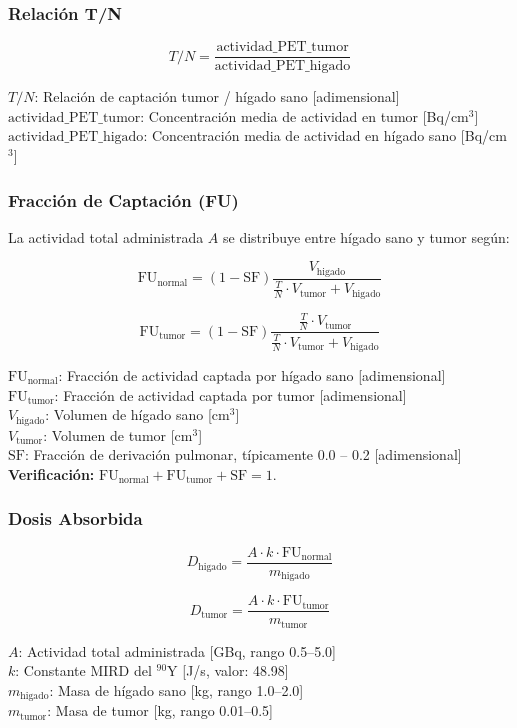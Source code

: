 \documentclass[12pt,a4paper]{article}
\newcommand{\vardef}[2]{\noindent\textbf{#1}: #2\\}
\begin{document}
\subsubsection{Relación T/N}

$$T/N = \frac{\text{actividad\_PET\_tumor}}{\text{actividad\_PET\_higado}}$$

\vardef{$T/N$}{Relación de captación tumor / hígado sano [adimensional]}
\vardef{$\text{actividad\_PET\_tumor}$}{Concentración media de actividad en tumor [Bq/cm$^3$]}
\vardef{$\text{actividad\_PET\_higado}$}{Concentración media de actividad en hígado sano [Bq/cm$^3$]}

\subsubsection{Fracción de Captación (FU)}

La actividad total administrada $A$ se distribuye entre hígado sano y tumor según:

$$\text{FU}_{\text{normal}} = (1-\text{SF})\frac{V_{\text{higado}}}{\frac{T}{N}\cdot V_{\text{tumor}} + V_{\text{higado}}}$$

$$\text{FU}_{\text{tumor}} = (1-\text{SF})\frac{\frac{T}{N}\cdot V_{\text{tumor}}}{\frac{T}{N}\cdot V_{\text{tumor}} + V_{\text{higado}}}$$

\vardef{$\text{FU}_{\text{normal}}$}{Fracción de actividad captada por hígado sano [adimensional]}
\vardef{$\text{FU}_{\text{tumor}}$}{Fracción de actividad captada por tumor [adimensional]}
\vardef{$V_{\text{higado}}$}{Volumen de hígado sano [cm$^3$]}
\vardef{$V_{\text{tumor}}$}{Volumen de tumor [cm$^3$]}
\vardef{$\text{SF}$}{Fracción de derivación pulmonar, típicamente 0.0 -- 0.2 [adimensional]}

\textbf{Verificación:} $\text{FU}_{\text{normal}} + \text{FU}_{\text{tumor}} + \text{SF} = 1$.

\subsubsection{Dosis Absorbida}

$$D_{\text{higado}} = \frac{A \cdot k \cdot \text{FU}_{\text{normal}}}{m_{\text{higado}}}$$

$$D_{\text{tumor}} = \frac{A \cdot k \cdot \text{FU}_{\text{tumor}}}{m_{\text{tumor}}}$$

\vardef{$A$}{Actividad total administrada [GBq, rango 0.5--5.0]}
\vardef{$k$}{Constante MIRD del $^{90}$Y [J/s, valor: 48.98]}
\vardef{$m_{\text{higado}}$}{Masa de hígado sano [kg, rango 1.0--2.0]}
\vardef{$m_{\text{tumor}}$}{Masa de tumor [kg, rango 0.01--0.5]}
\end{document}
